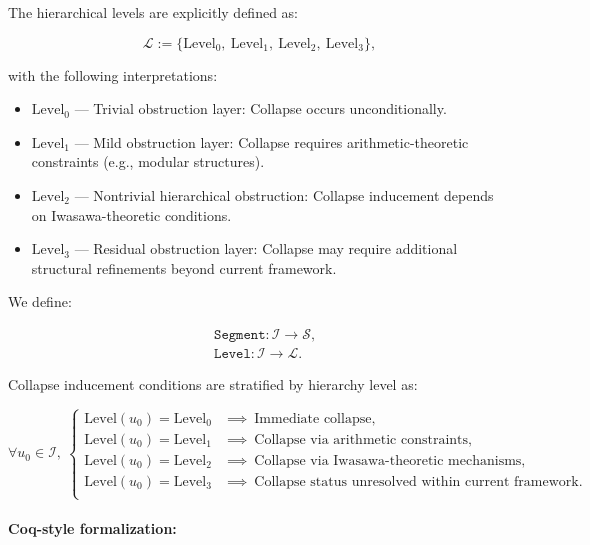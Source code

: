 \documentclass[11pt]{article}
\begin{document}
The hierarchical levels are explicitly defined as:

\[
\mathcal{L} := \{ \mathrm{Level}_0,\ \mathrm{Level}_1,\ \mathrm{Level}_2,\ \mathrm{Level}_3 \},
\]

with the following interpretations:

\begin{itemize}
  \item \( \mathrm{Level}_0 \) — Trivial obstruction layer: Collapse occurs unconditionally.
  \item \( \mathrm{Level}_1 \) — Mild obstruction layer: Collapse requires arithmetic-theoretic constraints (e.g., modular structures).
  \item \( \mathrm{Level}_2 \) — Nontrivial hierarchical obstruction: Collapse inducement depends on Iwasawa-theoretic conditions.
  \item \( \mathrm{Level}_3 \) — Residual obstruction layer: Collapse may require additional structural refinements beyond current framework.
\end{itemize}

We define:

\[
\begin{aligned}
& \texttt{Segment} : \mathcal{I} \to \mathcal{S}, \\
& \texttt{Level} : \mathcal{I} \to \mathcal{L}.
\end{aligned}
\]

Collapse inducement conditions are stratified by hierarchy level as:

\[
\forall u_0 \in \mathcal{I},\ 
\begin{cases}
\mathrm{Level}(u_0) = \mathrm{Level}_0 & \implies\ \text{Immediate collapse}, \\
\mathrm{Level}(u_0) = \mathrm{Level}_1 & \implies\ \text{Collapse via arithmetic constraints}, \\
\mathrm{Level}(u_0) = \mathrm{Level}_2 & \implies\ \text{Collapse via Iwasawa-theoretic mechanisms}, \\
\mathrm{Level}(u_0) = \mathrm{Level}_3 & \implies\ \text{Collapse status unresolved within current framework}. \\
\end{cases}
\]

\paragraph{Coq-style formalization:}
\end{document}
